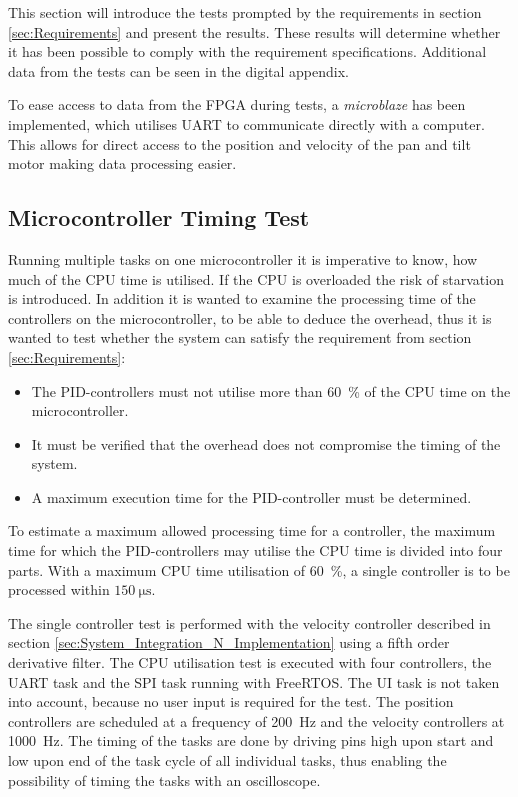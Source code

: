 \documentclass[../../main.tex]{subfiles}
\begin{document}
This section will introduce the tests prompted by the requirements in section \ref{sec:Requirements} and present the results. These results will determine whether it has been possible to comply with the requirement specifications. Additional data from the tests can be seen in the digital appendix. 

To ease access to data from the FPGA during tests, a \textit{microblaze} has been implemented, which utilises UART to communicate directly with a computer. This allows for direct access to the position and velocity of the pan and tilt motor making data processing easier. 

\subsection{Microcontroller Timing Test}
Running multiple tasks on one microcontroller it is imperative to know, how much of the CPU time is utilised. If the CPU is overloaded the risk of starvation is introduced. In addition it is wanted to examine the processing time of the controllers on the microcontroller, to be able to deduce the overhead, thus it is wanted to test whether the system can satisfy the requirement from section \ref{sec:Requirements}:
\begin{itemize}
    \item The PID-controllers must not utilise more than \SI{60}{\percent} of the CPU time on the microcontroller.
    \item It must be verified that the overhead does not compromise the timing of the system.
    \item A maximum execution time for the PID-controller must be determined.
\end{itemize}

To estimate a maximum allowed processing time for a controller, the maximum time for which the PID-controllers may utilise the CPU time is divided into four parts. With a maximum CPU time utilisation of \SI{60}{\percent}, a single controller is to be processed within $\SI{150}{\micro \second}$.

The single controller test is performed with the velocity controller described in section \ref{sec:System_Integration_N_Implementation} using a fifth order derivative filter. The CPU utilisation test is executed with four controllers, the UART task and the SPI task running with FreeRTOS. The UI task is not taken into account, because no user input is required for the test. The position controllers are scheduled at a frequency of \SI{200}{\hertz} and the velocity controllers at \SI{1000}{\hertz}. The timing of the tasks are done by driving pins high upon start and low upon end of the task cycle of all individual tasks, thus enabling the possibility of timing the tasks with an oscilloscope.
\end{document}
